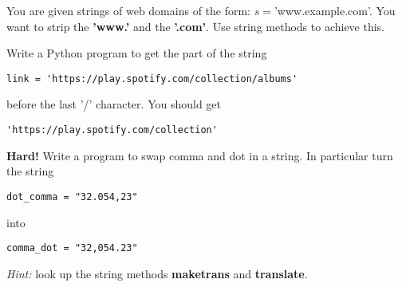 \documentclass[11pt]{exam}
\begin{document}
\begin{questions}
\item You are given strings of web domains of the form: $s = $'www.example.com'. You want to strip the \textbf{'www.'} and the \textbf{'.com'}. Use string methods to achieve this.

\item Write a Python program to get the part of the string 
\begin{verbatim}
link = 'https://play.spotify.com/collection/albums'
\end{verbatim}
before the last '/' character. You should get \begin{verbatim}
'https://play.spotify.com/collection'
\end{verbatim}


\item \textbf{Hard!} Write a program to swap comma and dot in a string. In particular turn the string
\begin{verbatim}
dot_comma = "32.054,23"
\end{verbatim}
into
\begin{verbatim}
comma_dot = "32,054.23"
\end{verbatim}
\emph{Hint:} look up the string methods \textbf{maketrans} and \textbf{translate}.
\end{questions}

%
\end{document}
